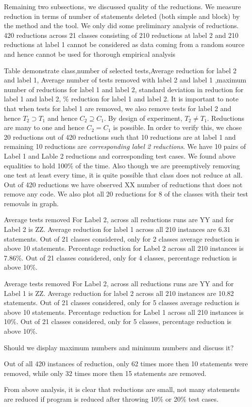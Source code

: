 Remaining two subsections, we discussed quality of the reductions. We measure reduction in terms of number of statements deleted (both simple and block) by the method and the tool. We only did some preliminary analysis of reductions. 420 reductions across 21 classes consisting of 210 reductions at label 2 and 210 reductions at label 1 cannot be considered as data coming from a random source and hence cannot be used for thorough empirical analysis

Table demonstrate class,number of selected tests,Average reduction for label 2 and label 1,  Average number of tests removed with label 2 and label 1 ,maximum number of reductions for label 1 and  label 2, standard deviation in reduction for label 1 and label 2, \% reduction for label 1 and label 2.  It is important to note that when tests for label 1 are removed, we also remove tests for label 2 and hence $T_{2} \supset T_{1}$ and hence $C_2 \supseteq C_1$. By design of experiment, $T_{2} \neq T_{1}$. Reductions are many to one and hence $C_2 = C_1$ is possible. In order to verify this, we chose 20 reductions out of 420 reductions such that 10 reductions are at label 1 and remaining 10 reductions are \emph{corresponding label 2 reductions}. We have 10 pairs of Label 1 and Lable 2 reductions and corresponding test cases. We found above equalities to hold 100\% of the time. Also though we are preemptively removing one test at least every time, it is quite possible that class does not reduce at all. Out of 420 reductions we have observed XX number of reductions that does not remove any code.  We also plot all 20 reductions for 8 of the classes with their test removals in graph.

Average tests removed For Label 2, across all reductions runs are YY and for Label 2 is ZZ. Average reduction for label 1 across all 210 instances are 6.31 statements. Out of 21 classes considered, only for 2 classes average reduction is above 10 statements. Percentage reduction for Label 2 across all 210 instances is 7.86\%. Out of 21 classes considered, only for 4 classes, percentage reduction is above 10\%. 

Average tests removed For Label 2, across all reductions runs are YY and for Label 1 is ZZ. Average reduction for label 2 across all 210 instances are 10.82 statements. Out of 21 classes considered, only for 5 classes average reduction is above 10 statements. Percentage reduction for Label 1 across all 210 instances is 10\%. Out of 21 classes considered, only for 5 classes, percentage reduction is above 10\%. 

Should we display maximum numbers and minimum numbers and discuss it?

Out of all 420 instances of reduction, only 62 times more then 10 statements were removed, while only 32 times more then 15 statements are removed.

From above analysis, it is clear that reductions are small, not many statements are reduced if program is reduced after throwing 10\% or 20\% test cases. 

   

